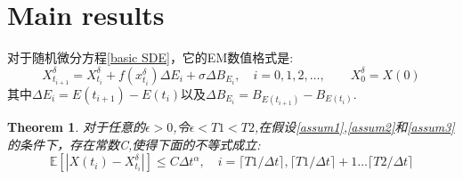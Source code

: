 \documentclass[12pt,final]{article}
\numberwithin{equation}{section}
\numberwithin{figure}{section}
\numberwithin{table}{section}
\theoremstyle{plain}
\newtheorem{theorem}{Theorem}[section]   %
\theoremstyle{definition}
\theoremstyle{remark}
\begin{document}
\section{Main results}
对于随机微分方程\eqref{basic SDE}，它的EM数值格式是:
\begin{equation}\label{eq:1}
	X_{t_{i+1}}^{\delta}=X_{t_i}^{\delta}+f(x_{t_i}^{\delta})\Delta E_{i}+\sigma\Delta B_{E_{i}},\quad i=0,1,2,\ldots,\qquad X_0^\delta=X(0)
\end{equation}
其中$\Delta E_{i}=E(t_{i+1})-E(t_i)$以及$\Delta B_{E_{i}}=B_{E{(t_{i+1})}}-B_{E({t_i})}$.
\begin{theorem}
	对于任意的$\epsilon>0$,令$\epsilon < T1 < T2$,在假设\ref{assum1},\ref{assum2}和\ref{assum3}的条件下，存在常数C,使得下面的不等式成立:
		$$\mathbb{E}[|X({t_i})-X_{t_i}^{\delta}|]\le C\Delta t^\alpha,\quad i=\lceil T1/\Delta t \rceil,\lceil T1/\Delta t \rceil+1 \ldots \lceil T2/\Delta t \rceil$$
\end{theorem}
\end{document}
